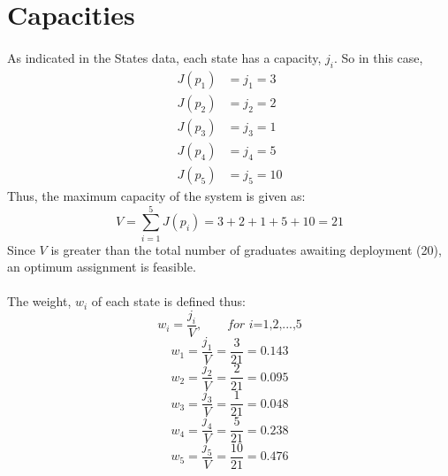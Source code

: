 \documentclass[a4paper,openany]{book}
\begin{document}
		\section{Capacities}		
			\paragraph{}
				As indicated in the States data, each state has a capacity, $j_i$. So in this case,
				\begin{align}
					J(p_1) &= j_1 = 3\\
					J(p_2) &= j_2 = 2\\
					J(p_3) &= j_3 = 1\\
					J(p_4) &= j_4 = 5\\
					J(p_5) &= j_5 = 10
				\end{align}
				Thus, the maximum capacity of the system is given as:
				\begin{equation}
					V = \sum_{i=1}^{5}{J(p_i)} = 3 + 2 + 1 + 5 + 10 = 21
				\end{equation}
			Since $V$ is greater than the total number of graduates awaiting deployment (20), an optimum assignment is feasible.
			\paragraph{}
				The weight, $w_i$ of each state is defined thus:
				\begin{equation}
					w_i = \frac{j_i}{V}, \qquad \textit{for i=1,2,...,5}
				\end{equation}
				\begin{equation}
					w_1 = \frac{j_1}{V} = \frac{3}{21} = 0.143
				\end{equation}
				\begin{equation}
					w_2 = \frac{j_2}{V} = \frac{2}{21} = 0.095
				\end{equation}
				\begin{equation}
					w_3 = \frac{j_3}{V} = \frac{1}{21} = 0.048
				\end{equation}
				\begin{equation}
					w_4 = \frac{j_4}{V} = \frac{5}{21} = 0.238
				\end{equation}
				\begin{equation}
					w_5 = \frac{j_5}{V} = \frac{10}{21} = 0.476
				\end{equation}
\end{document}
